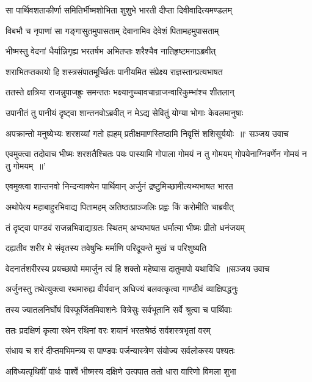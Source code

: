 \twolineshloka
{सा पार्थिवशताकीर्णा समितिर्भीष्मशोभिता}
{शुशुभे भारती दीप्ता दिवीवादित्यमण्डलम्}


\twolineshloka
{विबभौ च नृपाणां सा गङ्गासुतमुपासताम्}
{देवानामिव देवेशं पितामहमुपासताम्}


\twolineshloka
{भीष्मस्तु वेदनां धैर्यान्निगृह्य भरतर्षभ}
{अभितप्तः शरैश्चैव नातिहृष्टमनाऽब्रवीत्}


\twolineshloka
{शराभितप्तकायो हि शस्त्रसंपातमूर्च्छितः}
{पानीयमित संप्रेक्ष्य राज्ञस्तान्प्रत्यभाषत}


\twolineshloka
{ततस्ते क्षत्रिया राजन्नुपाजह्रुः समन्ततः}
{भक्ष्यानुच्चावचान्राजन्वारिकुम्भांश्च शीतलान्}


\twolineshloka
{उपानीतं तु पानीयं दृष्ट्वा शान्तनवोऽब्रवीत्}
{न मेऽद्य सेवितुं योग्या भोगाः केवलमानुषाः}


\threelineshloka
{अपक्रान्तो मनुष्येभ्यः शरशय्यां गतो ह्यहम्}
{प्रतीक्षमाणस्तिष्ठामि निवृत्तिं शशिसूर्ययोः ॥` सञ्जय उवाच}
{}


\threelineshloka
{एवमुक्त्वा तदोवाच भीष्मः शरशतैश्चितः}
{पयः पास्यामि गोपाला गोमयं न तु गोमयम्}
{गोपयेनाग्निवर्णेन गोमयं न तु गोमयम् ॥'}


\twolineshloka
{एवमुक्त्वा शान्तनवो निन्दन्वाक्येन पार्थिवान्}
{अर्जुनं द्रष्टुमिच्छामीत्यभ्यभाषत भारत}


\twolineshloka
{अथोपेत्य महाबाहुरभिवाद्य पितामहम्}
{अतिष्ठत्प्राञ्जलिः प्रह्वः किं करोमीति चाब्रवीत्}


\twolineshloka
{तं दृष्ट्वा पाण्डवं राजन्नभिवाद्याग्रतः स्थितम्}
{अभ्यभाषत धर्मात्मा भीष्मः प्रीतो धनंजयम्}


\twolineshloka
{दह्यतीव शरीर मे संवृतस्य तवेषुभिः}
{मर्माणि परिदूयन्ते मुखं च परिशुष्यति}


\threelineshloka
{वेदनार्तशरीरस्य प्रयच्छापो ममार्जुन}
{त्वं हि शक्तो महेष्वास दातुमापो यथाविधि ॥सञ्जय उवाच}
{}


\twolineshloka
{अर्जुनस्तु तथेत्युक्त्वा रथमारुह्य वीर्यवान्}
{अधिज्यं बलवत्कृत्वा गाण्डीवं व्याक्षिपद्धनुः}


\twolineshloka
{तस्य ज्यातलनिर्घोषं विस्फूर्जितमिवाशनेः}
{वित्रेसुः सर्वभूतानि सर्वे श्रुत्वा च पार्थिवाः}


\twolineshloka
{ततः प्रदक्षिणं कृत्वा रथेन रथिनां वरः}
{शयानं भरतश्रेष्ठं सर्वशस्त्रभृतां वरम्}


\twolineshloka
{संधाय च शरं दीप्तमभिमन्त्र्य स पाण्डवः}
{पर्जन्यास्त्रेण संयोज्य सर्वलोकस्य पश्यतः}


\twolineshloka
{अविध्यत्पृथिवीं पार्थः पार्श्वे भीष्मस्य दक्षिणे}
{उत्पपात ततो धारा वारिणो विमला शुभा}


